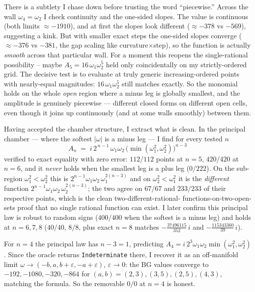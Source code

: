 \documentclass{article}
\begin{document}
There is a subtlety I chase down before trusting the word ``piecewise.'' Across
the wall $\omega_4=\omega_2$ I check continuity and the one-sided slopes. The
value is continuous (both limits $\approx-1910$), and at first the slopes look
different ($\approx-378$ vs $-569$), suggesting a kink. But with smaller exact
steps the one-sided slopes converge ($\approx-376$ vs $-381$, the gap scaling like
curvature$\times$step), so the function is actually \emph{smooth} across that
particular wall. For a moment this reopens the single-rational possibility --
maybe $A_5=16\,\omega_1\omega_2^5$ held only coincidentally on my strictly-ordered
grid. The decisive test is to evaluate at truly generic increasing-ordered
points with nearly-equal magnitudes: $16\,\omega_1\omega_2^5$ still matches
exactly. So the monomial holds on the whole \emph{open} region where a minus leg
is globally smallest, and the amplitude is genuinely piecewise --- different
closed forms on different open cells, even though it joins up continuously (and at
some walls smoothly) between them.

Having accepted the chamber structure, I extract what is clean. In the principal
chamber --- where the softest $|\omega|$ is a minus leg --- I find for every
tested $n$
\[
\boxed{\;A_n \;=\; i\,2^{\,n-1}\,\omega_1\omega_2\,
\bigl(\min(\omega_1^2,\omega_2^2)\bigr)^{n-3}\;}
\]
verified to exact equality with zero error: $112/112$ points at $n=5$, $420/420$
at $n=6$, and it \emph{never} holds when the smallest leg is a plus leg ($0/222$).
On the sub-region $\omega_1^2<\omega_2^2$ this is $2^{n-1}\omega_1\omega_2\,
\omega_1^{2(n-3)}$ and on $\omega_2^2<\omega_1^2$ it is the \emph{different}
function $2^{n-1}\omega_1\omega_2\,\omega_2^{2(n-3)}$; the two agree on $67/67$ and
$233/233$ of their respective points, which is the clean two-different-rational-
functions-on-two-open-sets proof that no single rational function can exist. I
later confirm this principal law is robust to random signs ($400/400$ when the
softest is a minus leg) and holds at $n=6,7,8$ ($40/40$, $8/8$, plus exact $n=8$
matches $-\tfrac{37496115}{352}\,i$ and $-\tfrac{115343360}{39}\,i$).

For $n=4$ the principal law has $n-3=1$, predicting
$A_4=i\,2^{3}\omega_1\omega_2\min(\omega_1^2,\omega_2^2)$. Since the oracle returns
\texttt{Indeterminate} there, I recover it as an off-manifold limit
$\omega\to(-b,a,b+\varepsilon,-a+\varepsilon)$, $\varepsilon\to0$: the BG values
converge to $-192,-1080,-320,-864$ for $(a,b)=(2,3),(3,5),(2,5),(4,3)$, matching
the formula. So the removable $0/0$ at $n=4$ is honest.
\end{document}
